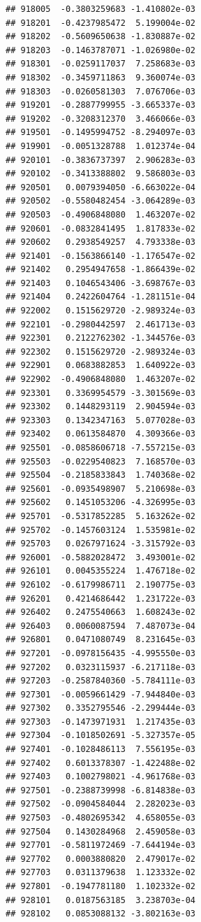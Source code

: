 \begin{frame}[fragile]
\begin{verbatim}
## 918005  -0.3803259683 -1.410802e-03
## 918201  -0.4237985472  5.199004e-02
## 918202  -0.5609650638 -1.830887e-02
## 918203  -0.1463787071 -1.026980e-02
## 918301  -0.0259117037  7.258683e-03
## 918302  -0.3459711863  9.360074e-03
## 918303  -0.0260581303  7.076706e-03
## 919201  -0.2887799955 -3.665337e-03
## 919202  -0.3208312370  3.466066e-03
## 919501  -0.1495994752 -8.294097e-03
## 919901  -0.0051328788  1.012374e-04
## 920101  -0.3836737397  2.906283e-03
## 920102  -0.3413388802  9.586803e-03
## 920501   0.0079394050 -6.663022e-04
## 920502  -0.5580482454 -3.064289e-03
## 920503  -0.4906848080  1.463207e-02
## 920601  -0.0832841495  1.817833e-02
## 920602   0.2938549257  4.793338e-03
## 921401  -0.1563866140 -1.176547e-02
## 921402   0.2954947658 -1.866439e-02
## 921403   0.1046543406 -3.698767e-03
## 921404   0.2422604764 -1.281151e-04
## 922002   0.1515629720 -2.989324e-03
## 922101  -0.2980442597  2.461713e-03
## 922301   0.2122762302 -1.344576e-03
## 922302   0.1515629720 -2.989324e-03
## 922901   0.0683882853  1.640922e-03
## 922902  -0.4906848080  1.463207e-02
## 923301   0.3369954579 -3.301569e-03
## 923302   0.1448293119  2.904594e-03
## 923303   0.1342347163  5.077028e-03
## 923402   0.0613584870  4.309366e-03
## 925501  -0.0858606718 -7.557215e-03
## 925503  -0.0229540823  7.168570e-03
## 925504  -0.2185833843  1.740368e-02
## 925601  -0.0935498907  5.210698e-03
## 925602   0.1451053206 -4.326995e-03
## 925701  -0.5317852285  5.163262e-02
## 925702  -0.1457603124  1.535981e-02
## 925703   0.0267971624 -3.315792e-03
## 926001  -0.5882028472  3.493001e-02
## 926101   0.0045355224  1.476718e-02
## 926102  -0.6179986711  2.190775e-03
## 926201   0.4214686442  1.231722e-03
## 926402   0.2475540663  1.608243e-02
## 926403   0.0060087594  7.487073e-04
## 926801   0.0471080749  8.231645e-03
## 927201  -0.0978156435 -4.995550e-03
## 927202   0.0323115937 -6.217118e-03
## 927203  -0.2587840360 -5.784111e-03
## 927301  -0.0059661429 -7.944840e-03
## 927302   0.3352795546 -2.299444e-03
## 927303  -0.1473971931  1.217435e-03
## 927304  -0.1018502691 -5.327357e-05
## 927401  -0.1028486113  7.556195e-03
## 927402   0.6013378307 -1.422488e-02
## 927403   0.1002798021 -4.961768e-03
## 927501  -0.2388739998 -6.814838e-03
## 927502  -0.0904584044  2.282023e-03
## 927503  -0.4802695342  4.658055e-03
## 927504   0.1430284968  2.459058e-03
## 927701  -0.5811972469 -7.644194e-03
## 927702   0.0003880820  2.479017e-02
## 927703   0.0311379638  1.123332e-02
## 927801  -0.1947781180  1.102332e-02
## 928101   0.0187563185  3.238703e-04
## 928102   0.0853088132 -3.802163e-03

\end{verbatim}
\end{frame}
